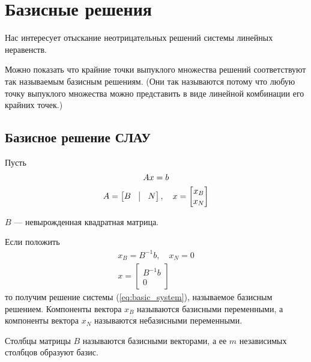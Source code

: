 \documentclass[a4paper,article,14pt]{extarticle}
\begin{document}
\newpage

\section{Базисные решения}

Нас интересует отыскание неотрицательных решений системы линейных неравенств.

Можно показать что крайние точки выпуклого множества решений соответствуют так называемым базисным решениям.
(Они так называются потому что любую точку выпуклого множества можно представить в виде линейной комбинации его крайних точек.)

\subsection{Базисное решение СЛАУ}

Пусть
\begin{equation} \label{eq:basic_system}
    \begin{gathered}
        Ax = b \\
        A =
        \begin{bmatrix}
            B & \vline & N
        \end{bmatrix}
        , \quad
        x =
        \begin{bmatrix}
            x_B \\ x_N
        \end{bmatrix}
    \end{gathered}
\end{equation}

\(B\) --- невырожденная квадратная матрица.

Если положить
\begin{equation}
    \begin{gathered}
        x_B = B^{-1}b, \quad x_N = 0 \\
        x = 
        \begin{bmatrix}
            B^{-1}b \\ 0
        \end{bmatrix}
    \end{gathered}
\end{equation}
то получим решение системы (\ref{eq:basic_system}), называемое базисным решением.
Компоненты вектора \(x_B\) называются базисными переменными, а компоненты вектора \(x_N\) называются небазисными переменными.

Столбцы матрицы \(B\) называются базисными векторами, а ее \(m\) независимых столбцов образуют базис.
\end{document}
